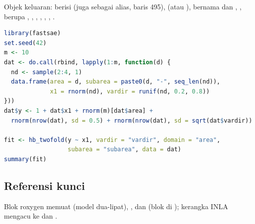 Objek keluaran: 
berisi  (juga  sebagai alias, baris 495),
 (atau ),  bernama
 dan , , 
berupa , , , ,
, , .

\begin{lstlisting}[language=R,caption={Contoh yang dapat dijalankan (dari \texttt{man/hb\_twofold.Rd}).}]
library(fastsae)
set.seed(42)
m <- 10
dat <- do.call(rbind, lapply(1:m, function(d) {
  nd <- sample(2:4, 1)
  data.frame(area = d, subarea = paste0(d, "-", seq_len(nd)),
             x1 = rnorm(nd), vardir = runif(nd, 0.2, 0.8))
}))
dat$y <- 1 + dat$x1 + rnorm(m)[dat$area] +
  rnorm(nrow(dat), sd = 0.5) + rnorm(nrow(dat), sd = sqrt(dat$vardir))

fit <- hb_twofold(y ~ x1, vardir = "vardir", domain = "area",
                  subarea = "subarea", data = dat)
summary(fit)
\end{lstlisting}

\subsection{Referensi kunci}\label{sec:hbtwofold-ref}

Blok roxygen memuat \citet{torabi2014small} (model dua-lipat),
\citet{rao2015small}, dan \citet{riebler2016intuitive}
(blok  di ); kerangka INLA mengacu ke
\citet{rue2009approximate} dan \citet{lindgren2015bayesian}.
